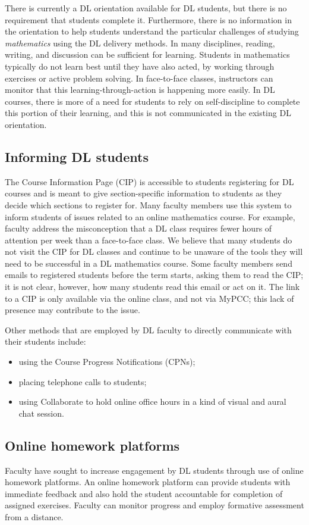 There is currently a DL orientation available for DL students, but there is no requirement that students complete it.
Furthermore, there is no information in the orientation to help students understand the particular challenges of studying \emph{mathematics} using the DL delivery methods.
In many disciplines, reading, writing, and discussion can be sufficient for learning.
Students in mathematics typically do not learn best until they have also acted, by working through exercises or active problem solving.
In face-to-face classes, instructors can monitor that this learning-through-action is happening more easily.
In DL courses, there is more of a need for students to rely on self-discipline to complete this portion of their learning, and this is not communicated in the existing DL orientation.

\subsection{Informing DL students}
The Course Information Page (CIP) is accessible to students registering for DL courses and is meant to give section-specific information to students as they decide which sections to register for.
Many faculty members use this system to inform students of issues related to an online mathematics course.
For example, faculty address the misconception that a DL class requires fewer hours of attention per week than a face-to-face class.
We believe that many students do not visit the CIP for DL classes and continue to be unaware of the tools they will need to be successful in a DL mathematics course.
Some faculty members send emails to registered students before the term starts, asking them to read the CIP;  it is not clear, however, how many students read this email or act on it.
The link to a CIP is only available via the online class, and not via MyPCC; this lack of presence may contribute to the issue.

Other methods that are employed by DL faculty to directly communicate with their students include:
\begin{itemize}
	\item using the Course Progress Notifications (CPNs);
	\item placing telephone calls to students;
	\item using Collaborate to hold online office hours in a kind of visual and aural chat session.
\end{itemize}

\subsection{Online homework platforms}
Faculty have sought to increase engagement by DL students through use of online homework platforms.
An online homework platform can provide students with immediate feedback and also hold the student accountable for completion of assigned exercises.
Faculty can monitor progress and employ formative assessment from a distance.


